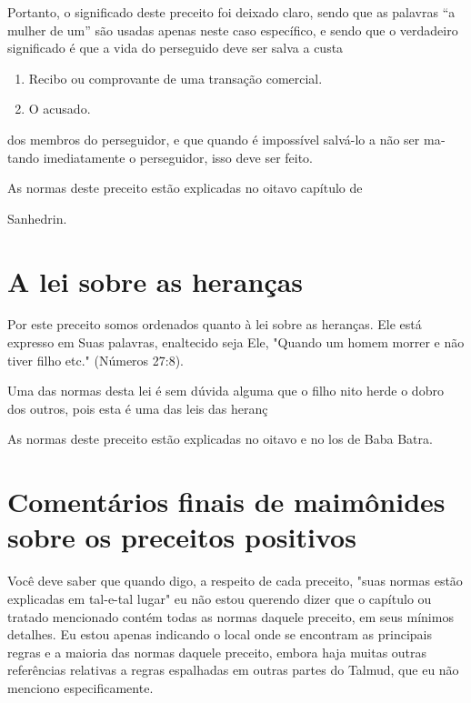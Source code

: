 Portanto, o significado deste preceito foi deixado claro, sendo que as
palavras ``a mulher de um'' são usadas apenas neste caso específico, e
sendo que o verdadeiro significado é que a vida do perseguido deve ser
salva a custa


\begin{enumerate}
\def\labelenumi{\arabic{enumi}.}
\setcounter{enumi}{227}
\item
 
 Recibo ou comprovante de uma transação comercial.
 
\item
 
 O acusado.
 
\end{enumerate}

dos membros do perseguidor, e que quando é impossível salvá-lo a não ser
ma­tando imediatamente o perseguidor, isso deve ser feito.


As normas deste preceito estão explicadas no oitavo capítulo de


Sanhedrin.

\section{A lei sobre as heranças}

Por este preceito somos ordenados quanto à lei sobre as heranças. Ele
está expresso em Suas palavras, enaltecido seja Ele, "Quando um homem
morrer e não tiver filho etc." (Números 27:8).

Uma das normas desta lei é sem dúvida alguma que o filho nito herde o
dobro dos outros, pois esta é uma das leis das heranç

As normas deste preceito estão explicadas no oitavo e no los de Baba
Batra.


\section{Comentários finais de maimônides sobre os preceitos positivos}


Você deve saber que quando digo, a respeito de cada preceito, "suas
normas estão explicadas em tal-e-tal lugar" eu não estou querendo dizer
que o capítulo ou tratado mencionado contém todas as normas daquele
preceito, em seus mínimos detalhes. Eu estou apenas indicando o local
onde se encon­tram as principais regras e a maioria das normas daquele
preceito, embora haja muitas outras referências relativas a regras
espalhadas em outras partes do Tal­mud, que eu não menciono
especificamente.

